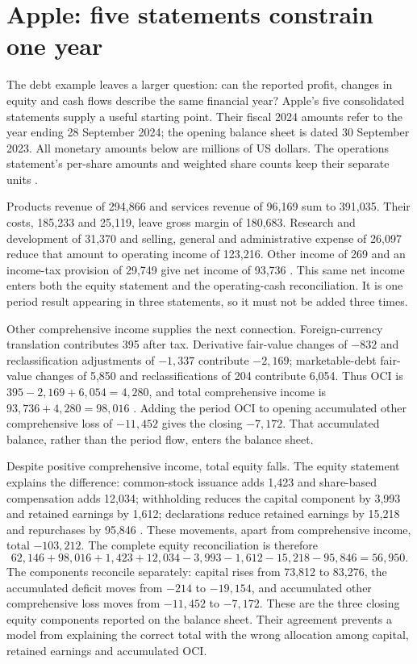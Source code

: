 \section{Apple: five statements constrain one year}
\label{sec:apple-statements}

The debt example leaves a larger question: can the reported profit, changes
in equity and cash flows describe the same financial year? Apple's five
consolidated statements supply a useful starting point. Their fiscal 2024
amounts refer to the year ending 28 September 2024; the opening balance sheet
is dated 30 September 2023. All monetary amounts below are millions of US
dollars. The operations statement's per-share amounts and weighted share
counts keep their separate units \citep[printed pp.~29--33]{apple2024}.

Products revenue of 294,866 and services revenue of 96,169 sum to 391,035.
Their costs, 185,233 and 25,119, leave gross margin of 180,683. Research and
development of 31,370 and selling, general and administrative expense of
26,097 reduce that amount to operating income of 123,216. Other income of
269 and an income-tax provision of 29,749 give net income of 93,736
\citep[printed p.~29]{apple2024}. This same net income enters both the equity
statement and the operating-cash reconciliation. It is one period result
appearing in three statements, so it must not be added three times.

Other comprehensive income supplies the next connection. Foreign-currency
translation contributes 395 after tax. Derivative fair-value changes of
$-832$ and reclassification adjustments of $-1{,}337$ contribute $-2{,}169$;
marketable-debt fair-value changes of 5,850 and reclassifications of 204
contribute 6,054. Thus OCI is $395-2{,}169+6{,}054=4{,}280$, and total
comprehensive income is $93{,}736+4{,}280=98{,}016$
\citep[printed p.~30]{apple2024}. Adding the period OCI to opening accumulated
other comprehensive loss of $-11{,}452$ gives the closing $-7{,}172$.
That accumulated balance, rather than the period flow, enters the balance
sheet.

Despite positive comprehensive income, total equity falls. The equity
statement explains the difference: common-stock issuance adds 1,423 and
share-based compensation adds 12,034; withholding reduces the capital
component by 3,993 and retained earnings by 1,612; declarations reduce
retained earnings by 15,218 and repurchases by 95,846
\citep[printed p.~32]{apple2024}. These movements, apart from comprehensive
income, total $-103{,}212$. The complete equity reconciliation is therefore
\[
62{,}146+98{,}016+1{,}423+12{,}034-3{,}993-1{,}612
 -15{,}218-95{,}846=56{,}950.
\]
The components reconcile separately: capital rises from 73,812 to 83,276,
the accumulated deficit moves from $-214$ to $-19{,}154$, and accumulated
other comprehensive loss moves from $-11{,}452$ to $-7{,}172$. These are
the three closing equity components reported on the balance sheet. Their
agreement prevents a model from explaining the correct total with the wrong
allocation among capital, retained earnings and accumulated OCI.

